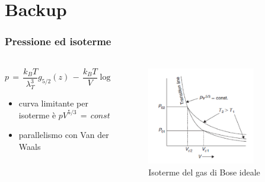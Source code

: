 \section{Backup}

\begin{frame}
    \frametitle{Pressione ed isoterme}
    \framesubtitle{}
  
    \begin{columns}
        \begin{column}{0.5\textwidth}
          $$
          p\,=\,\frac{k_BT}{\lambda_T^3}g_{5/2}\left(z\right)\,-\,\frac{k_BT}{V}\log{\left(1\,-\,z\right)}
          $$
          \vspace{12pt}
          \begin{itemize}[itemsep=0.5em, label=$\bullet$]
            \item curva limitante per isoterme è $pV^{5/3}\,=\,const$
            \item parallelismo con Van der Waals
          \end{itemize}
        \end{column}
        
        \begin{column}{0.5\textwidth}
          \begin{figure}
              \includegraphics[width=0.8\textwidth]{Immagini/isoBose.png}
              \caption{Isoterme del gas di Bose ideale}
          \end{figure}
        \end{column}
      \end{columns}
  
  \end{frame}